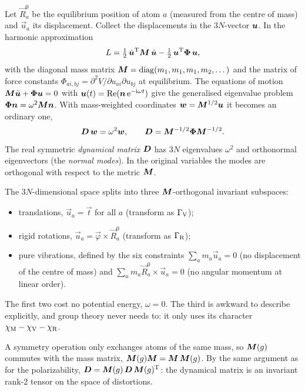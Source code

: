Let $\vec{R}_a^{0}$ be the equilibrium position of atom $a$ (measured from the
centre of mass) and $\vec{u}_a$ its displacement. Collect the displacements in the
$3N$-vector $\bm{u}$. In the harmonic approximation
\begin{equation}
  L=\tfrac12\,\dot{\bm{u}}^{\mathrm{T}}\bm{M}\,\dot{\bm{u}}-\tfrac12\,\bm{u}^{\mathrm{T}}\bm{\Phi}\,\bm{u},
\end{equation}
with the diagonal mass matrix $\bm{M}=\operatorname{diag}(m_1,m_1,m_1,m_2,\dots)$ and the matrix of
force constants $\Phi_{ai,bj}=\partial^2V/\partial u_{ai}\partial u_{bj}$ at
equilibrium. The equations of motion $\bm{M}\ddot{\bm{u}}+\bm{\Phi}\bm{u}=0$ with
$\bm{u}(t)=\operatorname{Re}(\bm{n}\,\mathrm{e}^{-\mathrm{i}\omega t})$ give the generalised eigenvalue
problem $\bm{\Phi}\bm{n}=\omega^2\bm{M}\bm{n}$. With mass-weighted coordinates
$\bm{w}=\bm{M}^{1/2}\bm{u}$ it becomes an ordinary one,
\begin{equation}
  \bm{D}\,\bm{w}=\omega^2\bm{w},\qquad \bm{D}=\bm{M}^{-1/2}\bm{\Phi}\bm{M}^{-1/2}.
\end{equation}
The real symmetric \emph{dynamical matrix} $\bm{D}$ has $3N$ eigenvalues $\omega^2$
and orthonormal eigenvectors (the \emph{normal modes}). In the original variables
the modes are orthogonal with respect to the metric $\bm{M}$.

The $3N$-dimensional space splits into three $\bm{M}$-orthogonal invariant subspaces:
\begin{itemize}
\item translations, $\vec{u}_a=\vec{t}$ for all $a$ (transform as $\Gamma_{\mathrm{V}}$);
\item rigid rotations, $\vec{u}_a=\vec{\varphi}\times\vec{R}_a^0$ (transform as $\Gamma_{\mathrm{R}}$);
\item pure vibrations, defined by the six constraints
      $\sum_am_a\vec{u}_a=0$ (no displacement of the centre of mass) and
      $\sum_am_a\vec{R}_a^0\times\vec{u}_a=0$ (no angular momentum at linear order).
\end{itemize}
The first two cost no potential energy, $\omega=0$. The third is awkward to describe
explicitly, and group theory never needs to: it only uses its character
$\chi_{\mathrm{M}}-\chi_{\mathrm{V}}-\chi_{\mathrm{R}}$.

A symmetry operation only exchanges atoms of the same mass, so $\bm{M}(g)$ commutes
with the mass matrix, $\bm{M}(g)\bm{M}=\bm{M}\,\bm{M}(g)$. By the same argument as
for the polarizability, $\bm{D}=\bm{M}(g)\,\bm{D}\,\bm{M}(g)^{\mathrm{T}}$: the dynamical matrix
is an invariant rank-2 tensor on the space of distortions.

